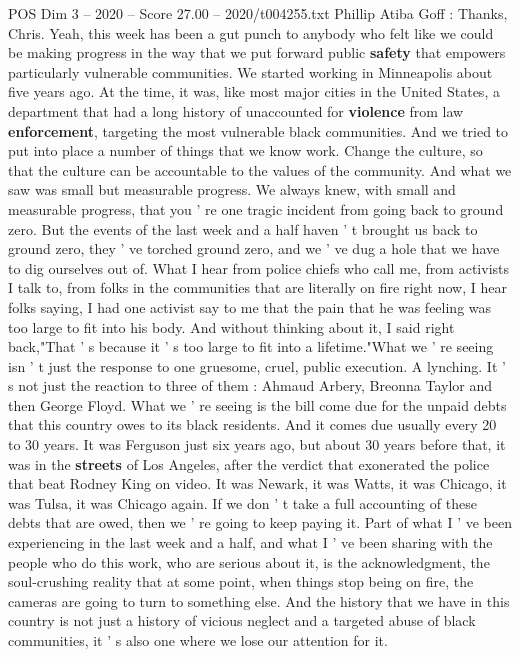 \begin{textsample}{POS Dim 3 – 2020 – Score 27.00 – 2020/t004255.txt}
Phillip Atiba Goff : Thanks, Chris.
Yeah, this week has been a gut punch to anybody who felt like we could be making progress in the way that we put forward public \textbf{safety} that empowers particularly vulnerable communities.
We started working in Minneapolis about five years ago.
At the time, it was, like most major cities in the United States, a department that had a long history of unaccounted for \textbf{violence} from law \textbf{enforcement}, targeting the most vulnerable black communities.
And we tried to put into place a number of things that we know work.
Change the culture, so that the culture can be accountable to the values of the community.
And what we saw was small but measurable progress.
We always knew, with small and measurable progress, that you ' re one tragic incident from going back to ground zero.
But the events of the last week and a half haven ' t brought us back to ground zero, they ' ve torched ground zero, and we ' ve dug a hole that we have to dig ourselves out of.
What I hear from police chiefs who call me, from activists I talk to, from folks in the communities that are literally on fire right now, I hear folks saying, I had one activist say to me that the pain that he was feeling was too large to fit into his body.
And without thinking about it, I said right back,"That ' s because it ' s too large to fit into a lifetime."What we ' re seeing isn ' t just the response to one gruesome, cruel, public execution.
A lynching.
It ' s not just the reaction to three of them : Ahmaud Arbery, Breonna Taylor and then George Floyd.
What we ' re seeing is the bill come due for the unpaid debts that this country owes to its black residents.
And it comes due usually every 20 to 30 years.
It was Ferguson just six years ago, but about 30 years before that, it was in the \textbf{streets} of Los Angeles, after the verdict that exonerated the police that beat Rodney King on video.
It was Newark, it was Watts, it was Chicago, it was Tulsa, it was Chicago again.
If we don ' t take a full accounting of these debts that are owed, then we ' re going to keep paying it.
Part of what I ' ve been experiencing in the last week and a half, and what I ' ve been sharing with the people who do this work, who are serious about it, is the acknowledgment, the soul-crushing reality that at some point, when things stop being on fire, the cameras are going to turn to something else.
And the history that we have in this country is not just a history of vicious neglect and a targeted abuse of black communities, it ' s also one where we lose our attention for it.

\end{textsample}
